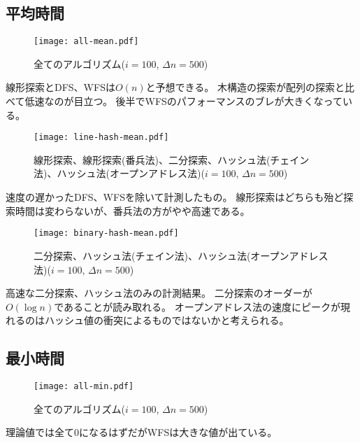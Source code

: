 \documentclass[dvipdfmx]{jsarticle}
\begin{document}
		\subsection{平均時間}
			\begin{figure}[H]
				\caption{全てのアルゴリズム($i = 100$, $\Delta n = 500$)}
				\texttt{[image: all-mean.pdf]}
				\label{fig:all-mean}
			\end{figure}
			線形探索とDFS、WFSは$O(n)$と予想できる。
			木構造の探索が配列の探索と比べて低速なのが目立つ。
			後半でWFSのパフォーマンスのブレが大きくなっている。
			\begin{figure}[H]
				\caption{線形探索、線形探索(番兵法)、二分探索、ハッシュ法(チェイン法)、ハッシュ法(オープンアドレス法)($i = 100$, $\Delta n = 500$)}
				\texttt{[image: line-hash-mean.pdf]}
				\label{fig:line-hash-mean}
			\end{figure}
			速度の遅かったDFS、WFSを除いて計測したもの。
			線形探索はどちらも殆ど探索時間は変わらないが、番兵法の方がやや高速である。
			\begin{figure}[H]
				\caption{二分探索、ハッシュ法(チェイン法)、ハッシュ法(オープンアドレス法)($i = 100$, $\Delta n = 500$)}
				\texttt{[image: binary-hash-mean.pdf]}
				\label{fig:binary-hash-mean}
			\end{figure}
			高速な二分探索、ハッシュ法のみの計測結果。
			二分探索のオーダーが$O(\log n)$であることが読み取れる。
			オープンアドレス法の速度にピークが現れるのはハッシュ値の衝突によるものではないかと考えられる。
		\subsection{最小時間}
			\begin{figure}[H]
				\caption{全てのアルゴリズム($i = 100$, $\Delta n = 500$)}
				\texttt{[image: all-min.pdf]}
			\end{figure}
			理論値では全て0になるはずだがWFSは大きな値が出ている。
\end{document}
